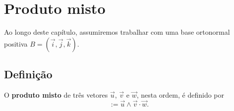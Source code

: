 
\chapter{Produto misto}\label{cap_prodmisto}
\thispagestyle{fancy}

Ao longo deste capítulo, assumiremos trabalhar com uma base ortonormal positiva $B = (\vec{i},\vec{j},\vec{k})$.

\section{Definição}\label{cap_prodmisto_sec_defn}

O {\bf produto misto} de três vetores $\vec{u}$, $\vec{v}$ e $\vec{w}$, nesta ordem, é definido por
\begin{equation}
  [\vec{u},\vec{v},\vec{w}] := \vec{u}\land\vec{v}\cdot\vec{w}.
\end{equation}


